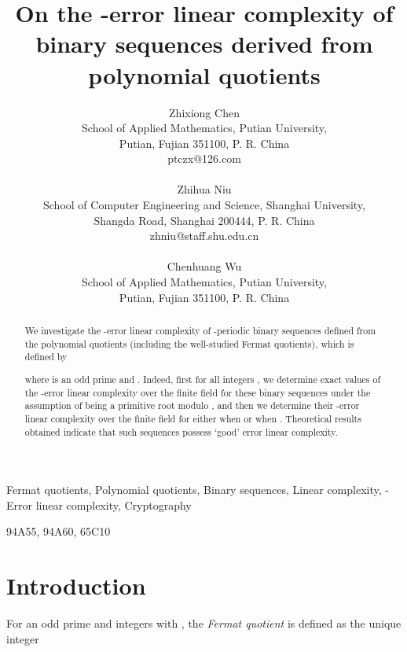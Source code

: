 \documentclass [11pt,a4paper]{article}
\begin{document}
\title{On the -error linear complexity of binary
sequences derived from polynomial quotients}

\author{Zhixiong Chen\\
School of Applied Mathematics, Putian University, \\ Putian, Fujian
351100, P. R. China\\
ptczx@126.com\\
\\
Zhihua Niu\\
School of Computer Engineering and Science, Shanghai University,\\
Shangda Road, Shanghai 200444, P. R. China \\
zhniu@staff.shu.edu.cn\\
\\
Chenhuang Wu\\
School of Applied Mathematics, Putian University, \\ Putian, Fujian
351100, P. R. China}
\maketitle


\begin{abstract}
We investigate the -error linear complexity of -periodic
binary sequences defined from the polynomial quotients (including the well-studied Fermat quotients), which is defined by

where  is an odd prime and . Indeed, first for all integers , we determine exact values of the -error linear complexity over the finite field  for these binary sequences under the assumption of  being a primitive root modulo , and then we determine their -error linear complexity over the finite field  for either  when  or  when . Theoretical results obtained indicate that such sequences possess `good' error linear complexity.
\end{abstract}



  Fermat quotients, Polynomial quotients, Binary sequences, Linear complexity, -Error linear complexity, Cryptography

 94A55, 94A60, 65C10


\section{Introduction}\label{intro}

For an odd prime  and integers  with , the {\it
Fermat quotient  \/} is defined as the unique integer
\end{document}
